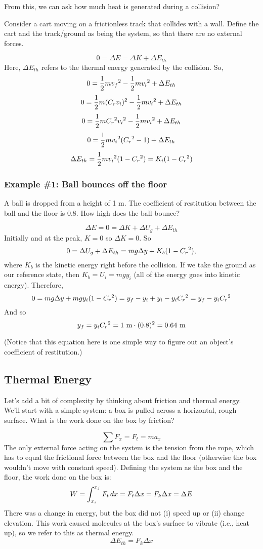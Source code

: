 From this, we can ask how much heat is generated during a collision?

Consider a cart moving on a frictionless track that collides with a wall. Define the cart and the track/ground as being the system, so that there are no external forces.

$$0=\Delta{E}=\Delta{K}+\Delta{E_{th}}$$
Here, $\Delta{E_{th}}$ refers to the thermal energy generated by the collision. So,
$$0=\frac{1}{2}mv_f\displaystyle^2-\frac{1}{2}mv_i\displaystyle^2+\Delta{E_{th}}$$
$$0=\frac{1}{2}m(C_rv_i)\displaystyle^2-\frac{1}{2}mv_i\displaystyle^2+\Delta{E_{th}}$$
$$0=\frac{1}{2}mC_r\displaystyle^2v_i\displaystyle^2-\frac{1}{2}mv_i\displaystyle^2+\Delta{E_{th}}$$
$$0=\frac{1}{2}mv_i\displaystyle^2(C_r\displaystyle^2-1)+\Delta{E_{th}}$$
$$\Delta{E_{th}}=\frac{1}{2}mv_i\displaystyle^2(1-C_r\displaystyle^2)=K_i(1-C_r\displaystyle^2)$$

\subsubsection{Example \#1: Ball bounces off the floor}
A ball is dropped from a height of 1 m. The coefficient of restitution between the ball and the floor is 0.8. How high does the ball bounce?

$$\Delta{E}=0=\Delta{K}+\Delta{U_g}+\Delta{E_{th}}$$
Initially and at the peak, $K=0$ so $\Delta{K}=0$. So
$$0=\Delta{U_g}+\Delta{E_{th}}=mg\Delta{y}+K_b(1-C_r\displaystyle^2),$$
where $K_b$ is the kinetic energy right before the collision. If we take the ground as our reference state, then $K_b=U_i=mgy_i$ (all of the energy goes into kinetic energy).  Therefore,
$$0=mg\Delta{y}+mgy_i(1-C_r\displaystyle^2)=y_f-y_i+y_i-y_iC_r\displaystyle^2=y_f-y_iC_r\displaystyle^2$$
And so
$$y_f=y_iC_r\displaystyle^2=1\mbox{ m}\cdot(0.8)^2=0.64\mbox{ m}$$

(Notice that this equation here is one simple way to figure out an object's coefficient of restitution.)


\subsection{Thermal Energy}
Let's add a bit of complexity by thinking about friction and thermal energy. We'll start with a simple system: a box is pulled across a horizontal, rough surface. What is the work done on the box by friction?

$$\sum F_x=F_t=ma_x$$
The only external force acting on the system is the tension from the rope, which has to equal the frictional force between the box and the floor (otherwise the box wouldn't move with constant speed). Defining the system as the box and the floor, the work done on the box is:
$$W=\displaystyle\int_{x_i}^{x_f}F_t\,dx=F_t\Delta{x}=F_k\Delta{x}=\Delta{E}$$
There was a change in energy, but the box did not (i) speed up or (ii) change elevation. This work caused molecules at the box's surface to vibrate (i.e., heat up), so we refer to this as thermal energy.
$$\boxed{\Delta{E_{th}}=F_k\Delta{x}}$$

